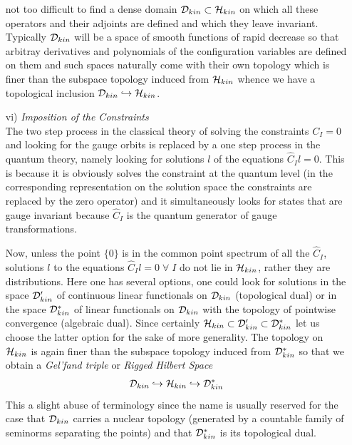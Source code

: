 \documentclass[12pt]{report}
\def\be{\begin{equation}}
\def\ee{\end{equation}}
\begin{document}
\begin{itemize}
not too difficult to find a dense domain 
${\cal D}_{kin}\subset {\cal H}_{kin}$ on which all these 
operators and their adjoints are defined and which they leave invariant.
Typically ${\cal D}_{kin}$ will be a space of smooth functions of rapid 
decrease so that arbitray derivatives and polynomials of the configuration
variables are defined on them and such spaces naturally come with their own 
topology which is finer than the subspace topology induced from 
${\cal H}_{kin}$ whence we have a topological inclusion
${\cal D}_{kin}\hookrightarrow {\cal H}_{kin}$.
\item[vi)] {\it Imposition of the Constraints}\\
The two step process in the classical theory of solving the 
constraints $C_I=0$ and looking for the gauge orbits is replaced by a one 
step process in the quantum theory, namely looking for solutions $l$ of 
the equations $\hat{C}_I l=0$. This is because it is obviously
solves the constraint at the quantum level (in the corresponding 
representation on the solution space the constraints are replaced by the 
zero operator) and it simultaneously looks for states that are gauge 
invariant because $\hat{C}_I$ is the quantum generator of gauge 
transformations.

Now, unless the point $\{0\}$ is in the common point spectrum of all the 
$\hat{C}_I$, solutions $l$ to the equations 
$\hat{C}_I l=0\;\forall\; I$ do not lie in ${\cal H}_{kin}$, rather 
they are distributions. Here one has several options, one could look
for solutions in the space ${\cal D}_{kin}'$ of continuous linear 
functionals on ${\cal D}_{kin}$ (topological dual) or in the space 
${\cal D}_{kin}^\ast$ of linear functionals on ${\cal D}_{kin}$ with the 
topology of pointwise convergence (algebraic dual). 
Since certainly ${\cal H}_{kin}\subset {\cal D}_{kin}'\subset {\cal 
D}_{kin}^\ast$ 
let us choose the latter option for the sake of more generality. The 
topology on ${\cal H}_{kin}$ is again finer than the subspace topology 
induced from ${\cal D}_{kin}^\ast$ so that we obtain a {\it Gel'fand triple}
or {\it Rigged Hilbert Space}
\be \label{1.3.1a} 
{\cal D}_{kin}\hookrightarrow {\cal H}_{kin} 
\hookrightarrow {\cal D}_{kin}^\ast
\ee
This a slight abuse of terminology since the name is usually reserved 
for the case that ${\cal D}_{kin}$ carries a nuclear topology 
(generated by a countable family of seminorms separating the points)
and that ${\cal D}_{kin}^\ast$ is its topological dual.


\end{itemize}
\end{document}
